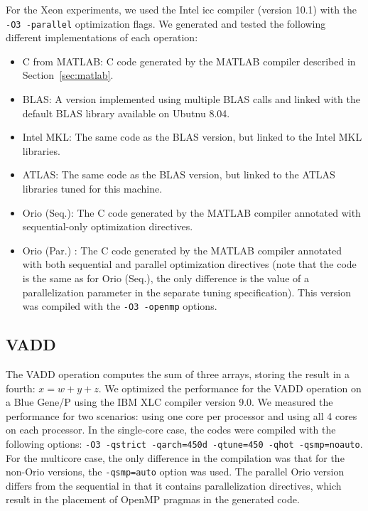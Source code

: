 \documentclass[runningheads]{llncs}
\newenvironment{itemizer}{\begin{itemize}\setlength{\parsep}{0cm}\setlength{\itemsep}{-.3em}}{\end{itemize}}
\begin{document}
For the Xeon experiments, we used the Intel icc compiler (version 10.1) with the \texttt{-O3 -parallel} optimization flags. We generated and tested the following different implementations of each operation:
\begin{itemizer}
\item C from MATLAB: C code generated by the MATLAB compiler described in Section~\ref{sec:matlab}.
\item BLAS: A version implemented using multiple BLAS calls and linked with the default BLAS library available on Ubutnu 8.04.
\item Intel MKL: The same code as the BLAS version, but linked to the Intel MKL libraries.
\item ATLAS: The same code as the BLAS version, but linked to the ATLAS libraries tuned for this machine.
\item Orio (Seq.): The C code generated by the MATLAB compiler annotated with sequential-only optimization directives.
\item Orio (Par.) : The C code generated by the MATLAB compiler annotated with both sequential and parallel optimization directives (note that the code is the same as for Orio (Seq.), the only difference is the value of a parallelization parameter in the separate tuning specification). This version was compiled with the \texttt{-O3 -openmp} options.
\end{itemizer}

\subsection{VADD}
\label{sec:vadd}

The VADD operation computes the sum of three arrays, storing the result in a fourth: $x = w + y + z$.
We optimized the performance for the VADD operation on a Blue Gene/P
using the IBM XLC compiler version 9.0. We measured the performance for two scenarios: using one core per processor and using all 4 cores on each processor. In the single-core case, the codes were compiled with the following options: \texttt{-O3 -qstrict -qarch=450d -qtune=450 -qhot -qsmp=noauto}. For the multicore case, the only difference in the compilation was that for the non-Orio versions, the \texttt{-qsmp=auto} option was used. The parallel Orio version differs from the sequential in that it contains parallelization directives, which result in the placement of OpenMP pragmas in the generated code.
\end{document}
